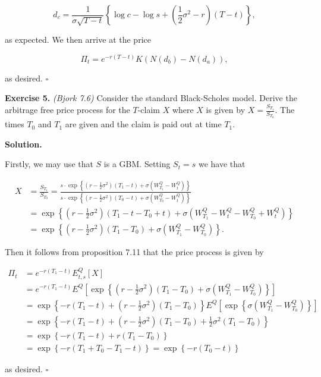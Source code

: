 \documentclass[
]{article}
\begin{document}
\[
d_c=\frac{1}{\sigma\sqrt{T-t}}\left\{\log c-\log s+\left(\frac{1}{2}\sigma ^2-r\right)(T-t)\right\},
\]

as expected. We then arrive at the price

\[
\Pi_t=e^{-r(T-t)}K(N(d_b)-N(d_a)),
\]

as desired. \(\square\)

\textbf{Exercise 5.} \emph{(Bjork 7.6)} Consider the standard
Black-Scholes model. Derive the arbitrage free price process for the
\(T\)-claim \(X\) where \(X\) is given by \(X=\frac{S_{T_1}}{S_{T_0}}\).
The times \(T_0\) and \(T_1\) are given and the claim is paid out at
time \(T_1\).

\textbf{Solution.}

Firstly, we may use that \(S\) is a GBM. Setting \(S_t=s\) we have that

\begin{align*}
X&=\frac{S_{T_1}}{S_{T_0}}=\frac{s\cdot \exp\left\{\left(r-\frac{1}{2}\sigma^2\right)(T_1-t) +\sigma\left(W_{T_1}^Q-W_t^Q\right)\right\}}{s\cdot \exp\left\{\left(r-\frac{1}{2}\sigma^2\right)(T_0-t) +\sigma\left(W_{T_0}^Q-W_t^Q\right)\right\}}\\
&=\exp\left\{\left(r-\frac{1}{2}\sigma^2\right)(T_1-t-T_0+t) +\sigma\left(W_{T_1}^Q-W_t^Q-W_{T_0}^Q+W_t^Q\right)\right\}\\
&=\exp\left\{\left(r-\frac{1}{2}\sigma^2\right)(T_1-T_0) +\sigma\left(W_{T_1}^Q-W_{T_0}^Q\right)\right\}.
\end{align*}

Then it follows from proposition 7.11 that the price process is given by

\begin{align*}
\Pi_t&=e^{-r(T_1-t)}E^Q_{t,s}[X]\\
&=e^{-r(T_1-t)}E^Q\left[\exp\left\{\left(r-\frac{1}{2}\sigma^2\right)(T_1-T_0) +\sigma\left(W_{T_1}^Q-W_{T_0}^Q\right)\right\}\right]\\
&=\exp\left\{-r(T_1-t)+\left(r-\frac{1}{2}\sigma^2\right)(T_1-T_0)\right\}E^Q\left[\exp\left\{\sigma\left(W_{T_1}^Q-W_{T_0}^Q\right)\right\}\right]\\
&=\exp\left\{-r(T_1-t)+\left(r-\frac{1}{2}\sigma^2\right)(T_1-T_0)+\frac{1}{2}\sigma^2(T_1-T_0)\right\}\\
&=\exp\left\{-r(T_1-t)+r(T_1-T_0)\right\}\\
&=\exp\left\{-r(T_1+T_0-T_1-t)\right\}=\exp\left\{-r(T_0-t)\right\}
\end{align*}

as desired. \(\square\)
\end{document}
